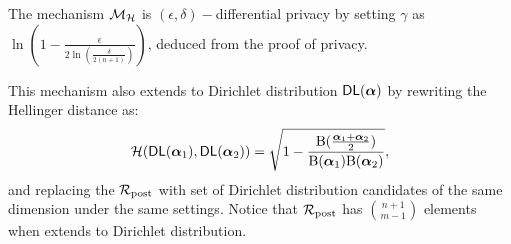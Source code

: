 \documentclass[sigconf, anonymous]{acmart}
\begin{document}
\begin{theorem}
The mechanism $\mathcal{M}_{\mathcal{H}}$ is $(\epsilon,\delta)-$differential privacy by setting $\gamma$ as $\ln(1 - \frac{\epsilon}{2 \ln (\frac{\delta}{2 (n + 1)})})$, deduced from the proof of privacy.
\end{theorem}

This mechanism also extends to Dirichlet distribution $\mathsf{DL}(\boldsymbol{\alpha})$ by rewriting the Hellinger distance as:
\[
\mathcal{H}(\mathsf{DL}(\boldsymbol{\alpha}_1), \mathsf{DL}(\boldsymbol{\alpha}_2)) = \sqrt{1 - \frac{\textup{B}(\frac{\boldsymbol{\alpha}_1 + \boldsymbol{\alpha}_2}{2})}{\textup{B}(\boldsymbol{\alpha}_1) \textup{B}(\boldsymbol{\alpha}_2)}},
\]
and replacing the $\mathcal{R}_{\textup{post}}$ with set of Dirichlet distribution candidates of the same dimension under the same settings. Notice that $\mathcal{R}_{\textup{post}}$ has $\binom{n + 1}{m - 1}$ elements when extends to Dirichlet distribution.





\end{document}
